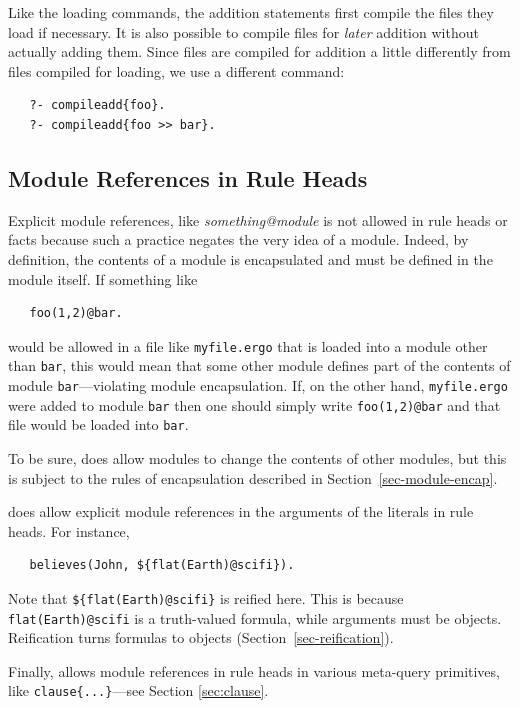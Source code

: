 \documentclass[11pt]{article}
\newcommand{\ERGO}{\mbox{\smaller{\ensuremath{\cal{E}}\smaller{{\sc{RGO}}}}}\xspace}
\newcommand{\FLSYSTEM}{\ERGO}
\newcommand{\ergoext}{ergo\xspace}
\begin{document}
Like the loading commands, the addition statements
first compile the files they load if necessary.
It is also possible to compile files for \emph{later} addition without
actually adding them. Since files are compiled for addition a little
differently from files compiled for loading, we use a different command:
\begin{verbatim}
   ?- compileadd{foo}.
   ?- compileadd{foo >> bar}.
\end{verbatim}

\subsection{Module References in Rule Heads}

Explicit module references, like \emph{something@module} is not allowed in
rule heads or facts because such a practice negates the very idea of a module.
Indeed, by definition, the contents of a module is encapsulated and must be
defined in the module itself. If something like
\begin{verbatim}
   foo(1,2)@bar.
\end{verbatim}
would be allowed in a file like \texttt{myfile.\ergoext} that is loaded into
a module other than \texttt{bar}, this would mean that some other module
defines part of the contents of module \texttt{bar}---violating module
encapsulation. If, on the other hand, \texttt{myfile.\ergoext} were added to
module \texttt{bar} then one should simply write \texttt{foo(1,2)@bar} and
that file would be loaded into \texttt{bar}.

To be sure, \FLSYSTEM does allow modules to change the contents
of other modules, but this is subject to the rules of encapsulation
described in Section~\ref{sec-module-encap}.

\FLSYSTEM does allow explicit module references in the arguments
of the literals in rule heads. For instance,
\begin{verbatim}
   believes(John, ${flat(Earth)@scifi}).
\end{verbatim}
Note that \texttt{\$\{flat(Earth)@scifi\}} is reified here. This is because
\texttt{flat(Earth)@scifi} is a truth-valued formula, while arguments must
be objects. Reification turns formulas to objects
(Section~\ref{sec-reification}).

Finally, \FLSYSTEM allows module references in rule heads in various
meta-query primitives, like \texttt{clause\{...\}}---see Section
\ref{sec:clause}.
\end{document}
